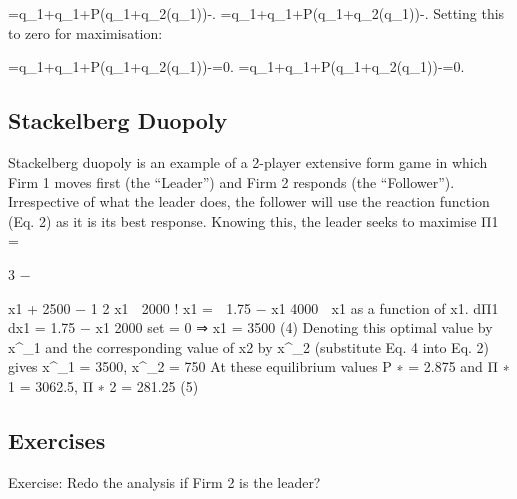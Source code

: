 {={}\cdot q_{1}+{}\cdot q_{1}+P(q_{1}+q_{2}(q_{1}))-{}.} {}={}\cdot q_{1}+{}\cdot q_{1}+P(q_{1}+q_{2}(q_{1}))-{}.
Setting this to zero for maximisation:

{={}\cdot q_{1}+{}\cdot q_{1}+P(q_{1}+q_{2}(q_{1}))-{}=0.} {}={}\cdot q_{1}+{}\cdot q_{1}+P(q_{1}+q_{2}(q_{1}))-{}=0.


\subsection{Stackelberg Duopoly}
Stackelberg duopoly is an example of a 2-player extensive form game in which Firm 1
moves first (the “Leader”) and Firm 2 responds (the “Follower”). Irrespective of what
the leader does, the follower will use the reaction function (Eq. 2) as it is its best response.
Knowing this, the leader seeks to maximise
Π1 =

3 −

x1 + 2500 −
1
2
x1

2000 !
x1 =

1.75 −
x1
4000

x1
as a function of x1.
dΠ1
dx1
= 1.75 −
x1
2000
set = 0
⇒ x1 = 3500 (4)
Denoting this optimal value by x^{\ast}_1
and the corresponding value of x2 by x^{\ast}_2
(substitute
Eq. 4 into Eq. 2) gives
x^{\ast}_1  = 3500, x^{\ast}_2 = 750
At these equilibrium values
P
∗ = 2.875
and
Π
∗
1 = 3062.5, Π
∗
2 = 281.25 (5)

\subsection{Exercises}
Exercise: Redo the analysis if Firm 2 is the leader?

